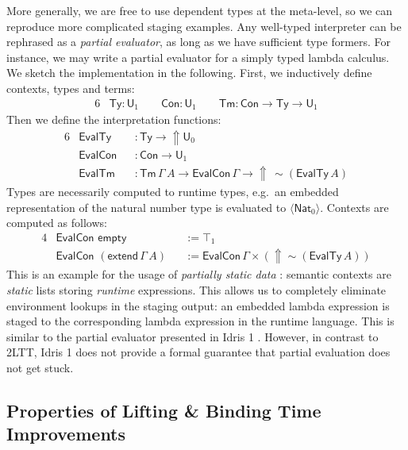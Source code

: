 \documentclass[acmsmall]{acmart}
\newcommand{\msf}[1]{\mathsf{#1}}
\newcommand{\Lift}{{\Uparrow}}
\newcommand{\spl}{{\sim}}
\newcommand{\qut}[1]{\langle #1\rangle}
\renewcommand{\U}{\msf{U}}
\newcommand{\Con}{\msf{Con}}
\newcommand{\Ty}{\msf{Ty}}
\newcommand{\Tm}{\msf{Tm}}
\newcommand{\Nat}{\msf{Nat}}
\theoremstyle{remark}
\begin{document}
More generally, we are free to use dependent types at the meta-level, so we can
reproduce more complicated staging examples. Any well-typed interpreter can be
rephrased as a \emph{partial evaluator}, as long as we have sufficient type
formers. For instance, we may write a partial evaluator for a simply typed
lambda calculus. We sketch the implementation in the following. First, we
inductively define contexts, types and terms:
\begin{alignat*}{6}
  & \Ty : \U_1  \hspace{2em} \Con : \U_1 \hspace{2em} \Tm : \Con \to \Ty \to \U_1
\end{alignat*}
Then we define the interpretation functions:
\begin{alignat*}{6}
  & \msf{EvalTy}  &&: \Ty \to \Lift \U_0 \\
  & \msf{EvalCon} &&: \Con \to \U_1 \\
  & \msf{EvalTm}  &&: \Tm\,\Gamma\,A \to \msf{EvalCon}\,\Gamma \to \Lift\,\spl(\msf{EvalTy}\,A)
\end{alignat*}
Types are necessarily computed to runtime types, e.g.\ an embedded
representation of the natural number type is evaluated to $\qut{\Nat_0}$.
Contexts are computed as follows:
\begin{alignat*}{4}
  &\msf{EvalCon}\,\,\msf{empty}                &&:= \top_1 \\
  &\msf{EvalCon}\,\,(\msf{extend}\,\Gamma\,A) &&:= \msf{EvalCon}\,\Gamma \times (\Lift \spl(\msf{EvalTy}\,A))
\end{alignat*}
This is an example for the usage of \emph{partially static data} \cite{partial-evaluation}:
semantic contexts are \emph{static} lists storing \emph{runtime}
expressions. This allows us to completely eliminate environment lookups in the
staging output: an embedded lambda expression is staged to the corresponding
lambda expression in the runtime language. This is similar to the partial
evaluator presented in Idris 1 \cite{scrap-your-inefficient-engine}. However, in
contrast to 2LTT, Idris 1 does not provide a formal guarantee that partial
evaluation does not get stuck.

\subsection{Properties of Lifting \& Binding Time Improvements}
\end{document}

